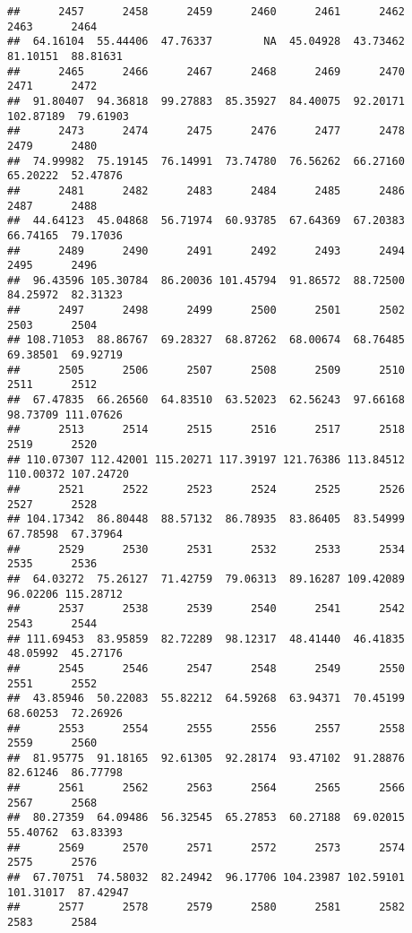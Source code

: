 \documentclass[
]{article}
\begin{document}
\begin{verbatim}
##      2457      2458      2459      2460      2461      2462      2463      2464 
##  64.16104  55.44406  47.76337        NA  45.04928  43.73462  81.10151  88.81631 
##      2465      2466      2467      2468      2469      2470      2471      2472 
##  91.80407  94.36818  99.27883  85.35927  84.40075  92.20171 102.87189  79.61903 
##      2473      2474      2475      2476      2477      2478      2479      2480 
##  74.99982  75.19145  76.14991  73.74780  76.56262  66.27160  65.20222  52.47876 
##      2481      2482      2483      2484      2485      2486      2487      2488 
##  44.64123  45.04868  56.71974  60.93785  67.64369  67.20383  66.74165  79.17036 
##      2489      2490      2491      2492      2493      2494      2495      2496 
##  96.43596 105.30784  86.20036 101.45794  91.86572  88.72500  84.25972  82.31323 
##      2497      2498      2499      2500      2501      2502      2503      2504 
## 108.71053  88.86767  69.28327  68.87262  68.00674  68.76485  69.38501  69.92719 
##      2505      2506      2507      2508      2509      2510      2511      2512 
##  67.47835  66.26560  64.83510  63.52023  62.56243  97.66168  98.73709 111.07626 
##      2513      2514      2515      2516      2517      2518      2519      2520 
## 110.07307 112.42001 115.20271 117.39197 121.76386 113.84512 110.00372 107.24720 
##      2521      2522      2523      2524      2525      2526      2527      2528 
## 104.17342  86.80448  88.57132  86.78935  83.86405  83.54999  67.78598  67.37964 
##      2529      2530      2531      2532      2533      2534      2535      2536 
##  64.03272  75.26127  71.42759  79.06313  89.16287 109.42089  96.02206 115.28712 
##      2537      2538      2539      2540      2541      2542      2543      2544 
## 111.69453  83.95859  82.72289  98.12317  48.41440  46.41835  48.05992  45.27176 
##      2545      2546      2547      2548      2549      2550      2551      2552 
##  43.85946  50.22083  55.82212  64.59268  63.94371  70.45199  68.60253  72.26926 
##      2553      2554      2555      2556      2557      2558      2559      2560 
##  81.95775  91.18165  92.61305  92.28174  93.47102  91.28876  82.61246  86.77798 
##      2561      2562      2563      2564      2565      2566      2567      2568 
##  80.27359  64.09486  56.32545  65.27853  60.27188  69.02015  55.40762  63.83393 
##      2569      2570      2571      2572      2573      2574      2575      2576 
##  67.70751  74.58032  82.24942  96.17706 104.23987 102.59101 101.31017  87.42947 
##      2577      2578      2579      2580      2581      2582      2583      2584 

\end{verbatim}
\end{document}
